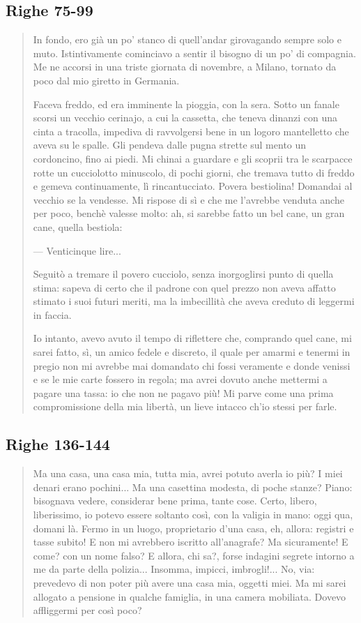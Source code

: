 \documentclass[a4paper, twoside, titlepage]{book}
\newcounter{mar}
\begin{document}
\subsection*{Righe 75-99}

\begin{quotation}
In fondo, ero già un po’ stanco di quell’andar girovagando sempre solo e muto. Istintivamente cominciavo a sentir il bisogno di un po’ di compagnia. Me ne accorsi in una triste giornata di novembre, a Milano, tornato da poco dal mio giretto in Germania.

Faceva freddo, ed era imminente la pioggia, con la sera. Sotto un fanale scorsi un vecchio cerinajo, a cui la cassetta, che teneva dinanzi con una cinta a tracolla, impediva di ravvolgersi bene in un logoro mantelletto che aveva su le spalle. Gli pendeva dalle pugna strette sul mento un cordoncino, fino ai piedi. Mi chinai a guardare e gli scoprii tra le scarpacce rotte un cucciolotto minuscolo, di pochi giorni, che tremava tutto di freddo e gemeva continuamente, lì rincantucciato. Povera bestiolina! Domandai al vecchio se la vendesse. Mi rispose di sì e che me l’avrebbe venduta anche per poco, benchè valesse molto: ah, si sarebbe fatto un bel cane, un gran cane, quella bestiola:

— Venticinque lire...

Seguitò a tremare il povero cucciolo, senza inorgoglirsi punto di quella stima: sapeva di certo che il padrone con quel prezzo non aveva affatto stimato i suoi futuri meriti, ma la imbecillità che aveva creduto di leggermi in faccia.

Io intanto, avevo avuto il tempo di riflettere che, comprando quel cane, mi sarei fatto, sì, un amico fedele e discreto, il quale per amarmi e tenermi in pregio non mi avrebbe mai domandato chi fossi veramente e donde venissi e se le mie carte fossero in regola; ma avrei dovuto anche mettermi a pagare una tassa: io che non ne pagavo più! Mi parve come una prima compromissione della mia libertà, un lieve intacco ch’io stessi per farle.
\end{quotation}

\subsection*{Righe 136-144}

\begin{quotation}
Ma una casa, una casa mia, tutta mia, avrei potuto averla io più? I miei denari erano pochini... Ma una casettina modesta, di poche stanze? Piano: bisognava vedere, considerar bene prima, tante cose. Certo, libero, liberissimo, io potevo essere soltanto così, con la valigia in mano: oggi qua, domani là. Fermo in un luogo, proprietario d’una casa, eh, allora: registri e tasse subito! E non mi avrebbero iscritto all’anagrafe? Ma sicuramente! E come? con un nome falso? E allora, chi sa?, forse indagini segrete intorno a me da parte della polizia... Insomma, impicci, imbrogli!... No, via: prevedevo di non poter più avere una casa mia, oggetti miei. Ma mi sarei allogato a pensione in qualche famiglia, in una camera mobiliata. Dovevo affliggermi per così poco?
\end{quotation}
\end{document}
